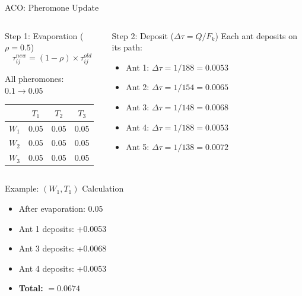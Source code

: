 \documentclass[aspectratio=43,8pt]{beamer}
\begin{document}
\begin{frame}{ACO: Pheromone Update}
\begin{columns}[t]
\begin{block}{Step 1: Evaporation ($\rho = 0.5$)}
$$\tau_{ij}^{new} = (1-\rho) \times \tau_{ij}^{old}$$

All pheromones: $0.1 \to 0.05$

\begin{center}
\small
\begin{tabular}{c|ccc}
\toprule
& $T_1$ & $T_2$ & $T_3$ \\
\midrule
$W_1$ & 0.05 & 0.05 & 0.05 \\
$W_2$ & 0.05 & 0.05 & 0.05 \\
$W_3$ & 0.05 & 0.05 & 0.05 \\
\bottomrule
\end{tabular}
\end{center}
\end{block}

\begin{alertblock}{Step 2: Deposit ($\Delta\tau = Q/F_k$)}
Each ant deposits on its path:
\begin{itemize}
    \item Ant 1: $\Delta\tau = 1/188 = 0.0053$
    \item Ant 2: $\Delta\tau = 1/154 = 0.0065$
    \item Ant 3: $\Delta\tau = 1/148 = 0.0068$
    \item Ant 4: $\Delta\tau = 1/188 = 0.0053$
    \item Ant 5: $\Delta\tau = 1/138 = 0.0072$
\end{itemize}
\end{alertblock}
\end{columns}

\vspace{0.3cm}
\begin{columns}[t]
\begin{block}{Example: $(W_1, T_1)$ Calculation}
\begin{itemize}
    \item After evaporation: 0.05
    \item Ant 1 deposits: +0.0053
    \item Ant 3 deposits: +0.0068
    \item Ant 4 deposits: +0.0053
    \item \textbf{Total:} $= \mathbf{0.0674}$
\end{itemize}
\end{block}


\end{columns}
\end{frame}
\end{document}

